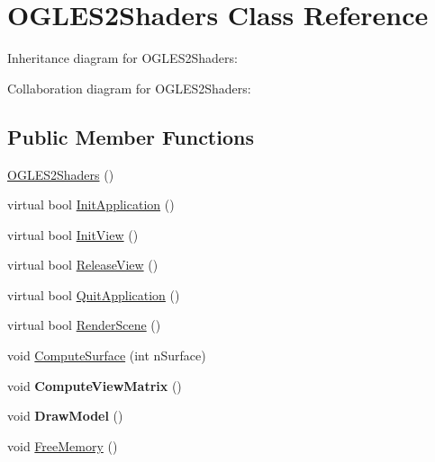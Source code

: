 \hypertarget{class_o_g_l_e_s2_shaders}{\section{O\+G\+L\+E\+S2\+Shaders Class Reference}
\label{class_o_g_l_e_s2_shaders}
}


Inheritance diagram for O\+G\+L\+E\+S2\+Shaders\+:


Collaboration diagram for O\+G\+L\+E\+S2\+Shaders\+:
\subsection*{Public Member Functions}
\begin{DoxyCompactItemize}
\item 
\hyperlink{class_o_g_l_e_s2_shaders_a39518bb8e7ca3d33365f32b470311070}{O\+G\+L\+E\+S2\+Shaders} ()
\item 
virtual bool \hyperlink{class_o_g_l_e_s2_shaders_a5dd559ee34de50641609c65a10789366}{Init\+Application} ()
\item 
virtual bool \hyperlink{class_o_g_l_e_s2_shaders_a9c2dcd2c42d0d9e8eba1acd00097be12}{Init\+View} ()
\item 
virtual bool \hyperlink{class_o_g_l_e_s2_shaders_a360a3a96f30ba5a95cf2e39b0f019bda}{Release\+View} ()
\item 
virtual bool \hyperlink{class_o_g_l_e_s2_shaders_a15a1b03e513be8f0c43ee76738459ce2}{Quit\+Application} ()
\item 
virtual bool \hyperlink{class_o_g_l_e_s2_shaders_a7c7cd5b91ea56316917f83c04cd88eb5}{Render\+Scene} ()
\item 
void \hyperlink{class_o_g_l_e_s2_shaders_a4f98c86e086e4b27e29d4977f35f10b0}{Compute\+Surface} (int n\+Surface)
\item 
\hypertarget{class_o_g_l_e_s2_shaders_aaff0f8e5e56f72de25e9f1b89041f27c}{void {\bfseries Compute\+View\+Matrix} ()}\label{class_o_g_l_e_s2_shaders_aaff0f8e5e56f72de25e9f1b89041f27c}

\item 
\hypertarget{class_o_g_l_e_s2_shaders_a886784422b7960c7e9bb4ca77446a7e1}{void {\bfseries Draw\+Model} ()}\label{class_o_g_l_e_s2_shaders_a886784422b7960c7e9bb4ca77446a7e1}

\item 
void \hyperlink{class_o_g_l_e_s2_shaders_ad943f9badd6d1be02f3f330bb501fbca}{Free\+Memory} ()
\end{DoxyCompactItemize}


